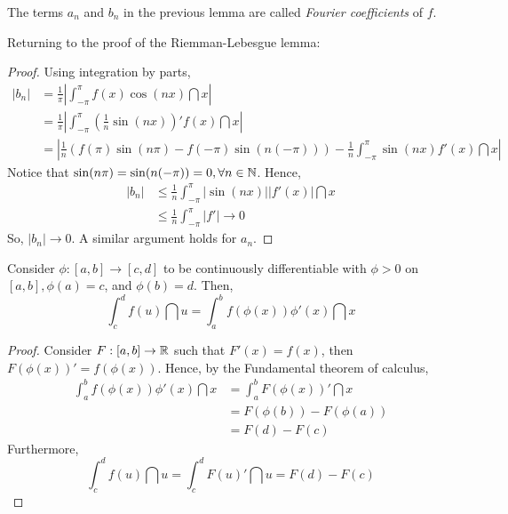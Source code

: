 \begin{definition}
    The terms $a_n$ and $b_n$ in the previous lemma are called \emph{Fourier coefficients} of $f$.
\end{definition}
Returning to the proof of the Riemman-Lebesgue lemma:
\begin{proof}
    Using integration by parts,
    \begin{align*}
        |b_n| &= \frac{1}{\pi} \left |
            \int_{-\pi}^\pi f(x) \cos (nx) \dint x
        \right | \\
        &= \frac{1}{\pi} \left |
            \int_{-\pi}^\pi \left( \frac{1}{n} \sin (nx)\right)' f(x) \dint x
        \right | \\
        &= \left |
            \frac{1}{n}(f(\pi)\sin(n\pi) - f(-\pi)\sin(n(-\pi))) - \frac{1}{n} \int_{-\pi}^\pi \sin(n x) f'(x) \dint x
        \right |
    \end{align*}
    Notice that $\sin(n \pi) = \sin(n(-\pi)) = 0, \forall n \in \mathbb{N}$. Hence,
    \begin{align*}
        |b_n| &\leq \frac{1}{n} \int_{-\pi}^\pi |\sin(nx)||f'(x)| \dint x \\
        &\leq \frac{1}{n} \int_{-\pi}^\pi |f'| \to 0
    \end{align*}
    So, $|b_n| \to 0$. A similar argument holds for $a_n$.
\end{proof}

\begin{theorem}
    Consider $\phi: [a,b] \to [c,d]$ to be continuously differentiable with $\phi > 0$ on $[a,b], \phi(a) = c$, and $\phi(b) = d$. Then,
    \begin{equation*}
        \int_c^d f(u) \dint u = \int_a^b f(\phi(x))\phi'(x)\dint x
    \end{equation*}
\end{theorem}

\begin{proof}
    Consider $F: [a,b] \to \mathbb{R}$ such that $F'(x) = f(x)$, then $F(\phi(x))' = f(\phi(x))$. Hence, by the Fundamental theorem of calculus,
    \begin{align*}
        \int_a^b f(\phi(x))\phi'(x) \dint x &= \int_a^b F(\phi(x))' \dint x \\
        &= F(\phi(b)) - F(\phi(a))  \\
        &= F(d) - F(c)
    \end{align*}
    Furthermore,
    \begin{equation*}
        \int_c^d f(u) \dint u = \int_c^d F(u)'\dint u = F(d)- F(c)
    \end{equation*}
\end{proof}